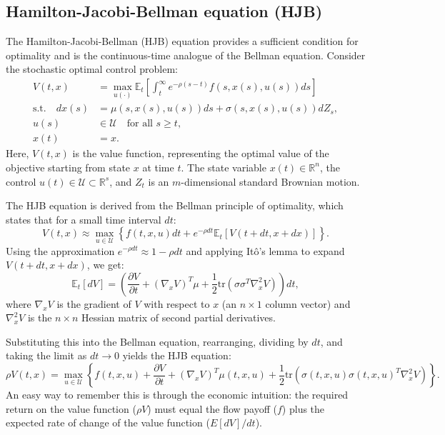 \documentclass[../../lecture_notes.tex]{subfiles}
\begin{document}
\subsection{Hamilton-Jacobi-Bellman equation (HJB)}

The Hamilton-Jacobi-Bellman (HJB) equation provides a sufficient condition for optimality and is the continuous-time analogue of the Bellman equation.
Consider the stochastic optimal control problem:
\begin{align*}
  V(t,x) &= \max_{u(\cdot)} \mathbb{E}_{t} \left[ \int_{t}^{\infty} e^{-\rho (s-t)} f(s, x(s), u(s)) ds \right] \\
  \text{s.t.} \quad dx(s) &= \mu(s, x(s), u(s))ds + \sigma(s, x(s), u(s))dZ_{s}, \\
  u(s) &\in \mathcal{U} \quad \text{for all } s \ge t, \\
  x(t) &= x.
\end{align*}
Here, $V(t,x)$ is the value function, representing the optimal value of the objective starting from state $x$ at time $t$.
The state variable $x(t) \in \mathbb{R}^n$, the control $u(t) \in \mathcal{U} \subset \mathbb{R}^s$, and $Z_t$ is an $m$-dimensional standard Brownian motion.

The HJB equation is derived from the Bellman principle of optimality, which states that for a small time interval $dt$:
\begin{equation*}
  V(t,x) \approx \max_{u \in \mathcal{U}} \left\{ f(t,x,u)dt + e^{-\rho dt} \mathbb{E}_t [V(t+dt, x+dx)] \right\}.
\end{equation*}
Using the approximation $e^{-\rho dt} \approx 1 - \rho dt$ and applying Itô's lemma to expand $V(t+dt, x+dx)$, we get:
\begin{equation*}
  \mathbb{E}_t[dV] = \left( \frac{\partial V}{\partial t} + (\nabla_x V)^T \mu + \frac{1}{2} \text{tr}\left( \sigma \sigma^T \nabla_x^2 V \right) \right) dt,
\end{equation*}
where $\nabla_x V$ is the gradient of $V$ with respect to $x$ (an $n \times 1$ column vector) and $\nabla_x^2 V$ is the $n \times n$ Hessian matrix of second partial derivatives.

Substituting this into the Bellman equation, rearranging, dividing by $dt$, and taking the limit as $dt \to 0$ yields the HJB equation:
\begin{equation}
  \rho V(t,x) = \max_{u \in \mathcal{U}} \left\{ f(t,x,u) + \frac{\partial V}{\partial t} + (\nabla_x V)^T \mu(t,x,u) + \frac{1}{2} \text{tr}\left( \sigma(t,x,u) \sigma(t,x,u)^T \nabla_x^2 V \right) \right\}.
  \label{eq:hjb}
\end{equation}
An easy way to remember this is through the economic intuition: the required return on the value function ($\rho V$) must equal the flow payoff ($f$) plus the expected rate of change of the value function ($E[dV]/dt$).
\end{document}
